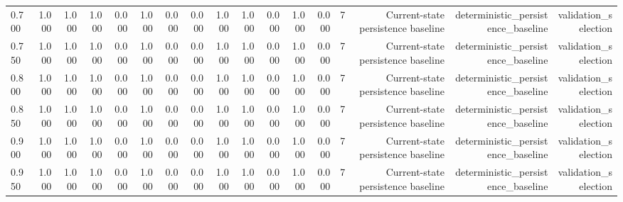 \begin{tabular}{lrrrrrrrrrrrrrrrr}
0.700 & 1.000 & 1.000 & 1.000 & 0.000 & 1.000 & 0.000 & 0.000 & 1.000 & 1.000 & 0.000 & 1.000 & 0.000 & 7 & Current-state persistence baseline & deterministic\_persistence\_baseline & validation\_selection \\
0.750 & 1.000 & 1.000 & 1.000 & 0.000 & 1.000 & 0.000 & 0.000 & 1.000 & 1.000 & 0.000 & 1.000 & 0.000 & 7 & Current-state persistence baseline & deterministic\_persistence\_baseline & validation\_selection \\
0.800 & 1.000 & 1.000 & 1.000 & 0.000 & 1.000 & 0.000 & 0.000 & 1.000 & 1.000 & 0.000 & 1.000 & 0.000 & 7 & Current-state persistence baseline & deterministic\_persistence\_baseline & validation\_selection \\
0.850 & 1.000 & 1.000 & 1.000 & 0.000 & 1.000 & 0.000 & 0.000 & 1.000 & 1.000 & 0.000 & 1.000 & 0.000 & 7 & Current-state persistence baseline & deterministic\_persistence\_baseline & validation\_selection \\
0.900 & 1.000 & 1.000 & 1.000 & 0.000 & 1.000 & 0.000 & 0.000 & 1.000 & 1.000 & 0.000 & 1.000 & 0.000 & 7 & Current-state persistence baseline & deterministic\_persistence\_baseline & validation\_selection \\
0.950 & 1.000 & 1.000 & 1.000 & 0.000 & 1.000 & 0.000 & 0.000 & 1.000 & 1.000 & 0.000 & 1.000 & 0.000 & 7 & Current-state persistence baseline & deterministic\_persistence\_baseline & validation\_selection \\
\bottomrule
\end{tabular}